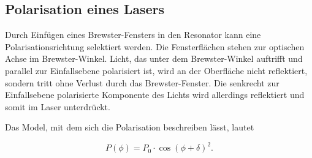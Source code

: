\subsection{Polarisation eines Lasers}
Durch Einfügen eines Brewster-Fensters in den Resonator kann eine Polarisationsrichtung selektiert werden.
Die Fensterflächen stehen  zur optischen Achse im Brewster-Winkel. Licht, das unter dem Brewster-Winkel auftrifft und parallel zur Einfallsebene polarisiert ist, wird an der Oberfläche nicht reflektiert, sondern tritt ohne Verlust durch das Brewster-Fenster. Die senkrecht zur Einfallsebene polarisierte Komponente des Lichts wird allerdings reflektiert und somit im Laser unterdrückt.

Das Model, mit dem sich die Polarisation beschreiben lässt, lautet 

\begin{equation}
    P(\phi) = P_0 \cdot \cos\left( \phi + \delta \right)^2. 
    \label{eq:polar}
\end{equation}
